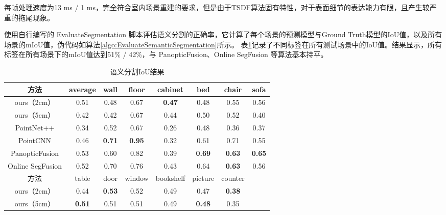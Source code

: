 \par 每帧处理速度为13 ms / 1 ms，完全符合室内场景重建的要求，但是由于TSDF算法固有特性，对于表面细节的表达能力有限，且产生较严重的拖尾现象。
\par 使用自行编写的 EvaluateSegmentation 脚本评估语义分割的正确率，它计算了每个场景的预测模型与Ground Truth模型的IoU值，以及所有场景的mIoU值，伪代码如算法\ref{algo:EvaluateSemanticSegmentation}所示。
表\ref{miou_2cm}记录了不同标签在所有测试场景中的IoU值。结果显示，所有标签在所有场景下的mIoU值达到51\% / 42\%，与 PanopticFusion、Online SegFusion 等算法基本持平。

\begin{table}[htbp]
	\centering
	\caption{语义分割IoU结果}
	\label{miou_2cm}
	\begin{tabular}{cccccccc}
		\toprule
		方法               & average       & wall          & floor         & cabinet       & bed           & chair         & sofa          \\
		\midrule
		ours（2cm）        & 0.51          & 0.48          & 0.67          & \textbf{0.47} & 0.48          & 0.55          & 0.56          \\
		ours（5cm）        & 0.42          & 0.42          & 0.67          & 0.44          & 0.50          & 0.52          & 0.40          \\
		PointNet++       & 0.34          & 0.52          & 0.67          & 0.26          & 0.48          & 0.36          & 0.37          \\
		PointCNN         & 0.46          & \textbf{0.71} & \textbf{0.95} & 0.32          & 0.61          & 0.71          & 0.55          \\
		PanopticFusion   & 0.53          & 0.60          & 0.82          & 0.39          & \textbf{0.69} & \textbf{0.63} & \textbf{0.65} \\
		Online SegFusion & 0.52          & 0.70          & 0.76          & 0.43          & 0.64          & \textbf{0.63} & 0.56          \\
		\toprule
		方法               & table         & door          & window        & bookshelf     & picture       & counter       &               \\
		\midrule
		ours（2cm）        & 0.44          & \textbf{0.53} & 0.52          & 0.49          & 0.47          & \textbf{0.38} &               \\
		ours（5cm）        & \textbf{0.51} & 0.51          & 0.51          & 0.49          & \textbf{0.48} & 0.35          &               \\

\end{tabular}
\end{table}
